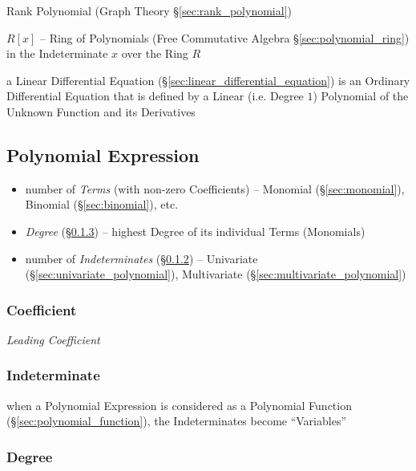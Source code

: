 \fist Rank Polynomial (Graph Theory \S\ref{sec:rank_polynomial})

$R[x]$ -- Ring of Polynomials (Free Commutative Algebra
\S\ref{sec:polynomial_ring}) in the Indeterminate $x$ over the Ring $R$

a Linear Differential Equation (\S\ref{sec:linear_differential_equation}) is an
Ordinary Differential Equation that is defined by a Linear (i.e. Degree $1$)
Polynomial of the Unknown Function and its Derivatives



\subsection{Polynomial Expression}\label{sec:polynomial_expression}

\begin{itemize}
  \item number of \emph{Terms} (with non-zero Coefficients) -- Monomial
    (\S\ref{sec:monomial}), Binomial (\S\ref{sec:binomial}), etc.
  \item \emph{Degree} (\S\ref{sec:degree}) -- highest Degree of its individual
    Terms (Monomials)
  \item number of \emph{Indeterminates} (\S\ref{sec:indeterminate}) --
    Univariate (\S\ref{sec:univariate_polynomial}), Multivariate
    (\S\ref{sec:multivariate_polynomial})
\end{itemize}



\subsubsection{Coefficient}\label{sec:coefficient}

\emph{Leading Coefficient}



\subsubsection{Indeterminate}\label{sec:indeterminate}

when a Polynomial Expression is considered as a Polynomial Function
(\S\ref{sec:polynomial_function}), the Indeterminates become ``Variables''



\subsubsection{Degree}\label{sec:degree}

